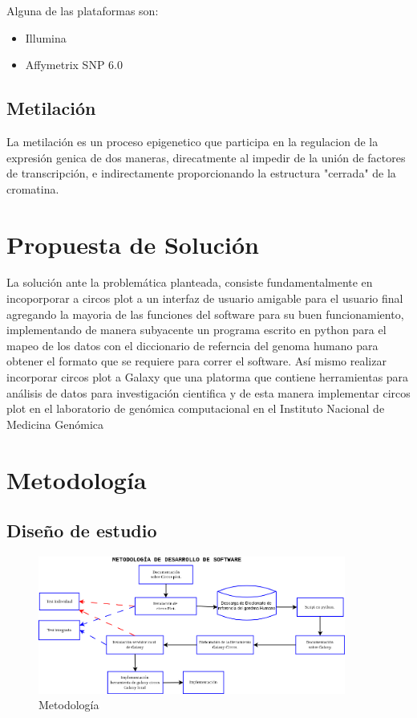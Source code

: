 \documentclass[12pt,letterpaper]{article}
\begin{document}
Alguna de las plataformas son:

\begin{itemize}
\item Illumina
\item Affymetrix SNP 6.0
\end{itemize}


\subsection{Metilación}
La metilación es un proceso epigenetico que participa en la regulacion de la expresión genica de dos maneras, direcatmente al impedir de la unión de factores de transcripción, e indirectamente proporcionando la estructura "cerrada" de la cromatina\cite{Mesa-Cornejo, Viviana Matilde, Barros-Núñez, Patricio, & Medina-Lozano, Claudina2006}.

\section{Propuesta de Solución}
La solución ante la problemática planteada, consiste fundamentalmente en incoporporar a circos plot a un interfaz de usuario amigable para el usuario final agregando la mayoria de las funciones del software para su buen funcionamiento, implementando de manera subyacente un programa escrito en python para el mapeo de los datos con el diccionario de referncia del genoma humano para obtener el formato que se requiere para correr el software.
Así mismo realizar incorporar circos plot a Galaxy que una platorma que contiene herramientas para análisis de datos para investigación cientifica y de esta manera implementar circos plot en el laboratorio de genómica computacional en el Instituto Nacional de Medicina Genómica

\section{Metodología}
\subsection{Diseño de estudio}

\begin{figure}[H]
\begin{center}
\includegraphics[width=0.9\textwidth]{METODOLOGIA.png}
\end{center}
\caption{Metodología}
\end{figure}
\end{document}
